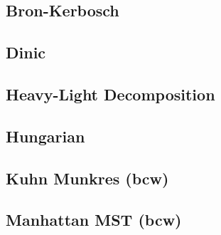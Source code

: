 \documentclass[11pt,twocolumn,a4paper]{article}
\begin{document}
\subsection{Bron-Kerbosch}


\subsection{Dinic}


\subsection{Heavy-Light Decomposition}


\subsection{Hungarian}


\subsection{Kuhn Munkres (bcw)}


\subsection{Manhattan MST (bcw)}

\end{document}
